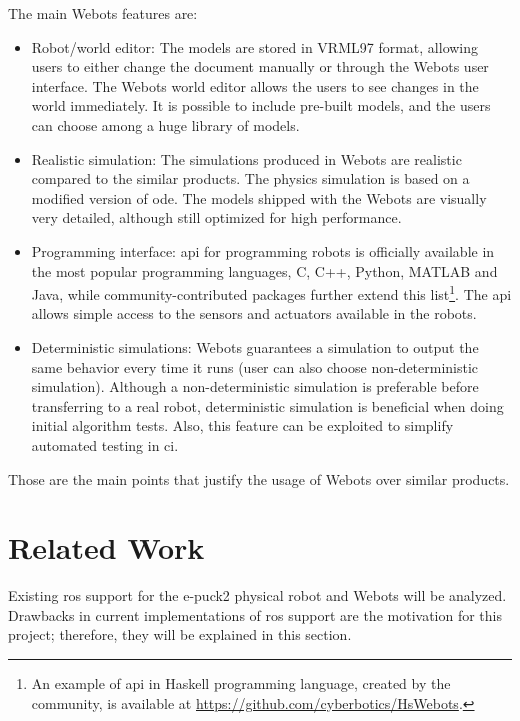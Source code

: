 The main Webots features are:
\begin{itemize}
    \item Robot/world editor: The models are stored in VRML97 format, allowing users to either change the document manually or through the Webots user interface. 
    The Webots world editor allows the users to see changes in the world immediately.
    It is possible to include pre-built models, and the users can choose among a huge library of models.
    \item Realistic simulation: The simulations produced in Webots are realistic compared to the similar products. 
    The physics simulation is based on a modified version of \ac{ode}.
    The models shipped with the Webots are visually very detailed, although still optimized for high performance.
    \item Programming interface: \ac{api} for programming robots is officially available in the most popular programming languages, C, C++, Python, MATLAB and Java, while community-contributed packages further extend this list\footnote{An example of \ac{api} in Haskell programming language, created by the community, is available at \url{https://github.com/cyberbotics/HsWebots}.}.
    The \ac{api} allows simple access to the sensors and actuators available in the robots.
    \item Deterministic simulations: Webots guarantees a simulation to output the same behavior every time it runs (user can also choose non-deterministic simulation).
    Although a non-deterministic simulation is preferable before transferring to a real robot, deterministic simulation is beneficial when doing initial algorithm tests.
    Also, this feature can be exploited to simplify automated testing in \ac{ci}.
\end{itemize}

Those are the main points that justify the usage of Webots over similar products.

\section{Related Work}
Existing \ac{ros} support for the e-puck2 physical robot and Webots will be analyzed.
Drawbacks in current implementations of \ac{ros} support are the motivation for this project; therefore, they will be explained in this section.

